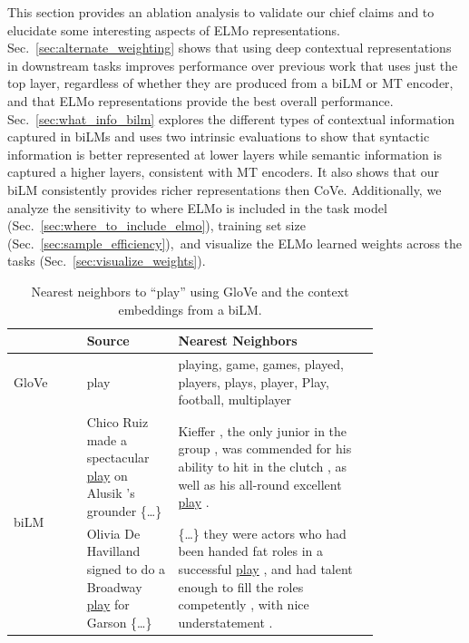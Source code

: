 \documentclass[11pt,a4paper]{article}
\newcommand{\ELMO}{ELMo}
\begin{document}
This section provides an ablation analysis to validate our chief claims and to elucidate some interesting aspects of \ELMO{} representations.
Sec.~\ref{sec:alternate_weighting} shows that using deep contextual representations in downstream tasks improves performance over previous work that uses just the top layer, regardless of whether they are produced from a biLM or MT encoder, and that \ELMO{} representations provide the best overall performance. 
Sec.~\ref{sec:what_info_bilm} explores the different types of contextual information captured in biLMs and uses two intrinsic evaluations to show that syntactic information is better represented at lower layers while semantic information is captured a higher layers, consistent with MT encoders.
It also shows that our biLM consistently provides richer representations then CoVe.
Additionally, we analyze the sensitivity to where \ELMO{} is included in the task model (Sec.~\ref{sec:where_to_include_elmo}), training set size (Sec.~\ref{sec:sample_efficiency}),~and visualize the \ELMO{} learned weights across the tasks (Sec.~\ref{sec:visualize_weights}). 


\begin{table}   %
\centering
\begin{tabular}{lm{0.25\linewidth}|m{0.55\linewidth}} \\
 & Source & Nearest Neighbors \\ \hline \hline
GloVe & play & playing, game, games, played, players, plays, player, Play, football, multiplayer \\ \hline
\multirow{2}{*}[-3ex]{biLM} & Chico Ruiz made a spectacular \underline{play} on Alusik 's grounder \{\ldots\}
& Kieffer , the only junior in the group , was commended for his ability to hit in the clutch , as well as his all-round excellent \underline{play} . \\ \cline{2-3}
& Olivia De Havilland signed to do a Broadway \underline{play} for Garson \{\ldots\}
& \{\ldots\} they were actors who had been handed fat roles in a successful \underline{play} , and had talent enough to fill the roles competently , with nice understatement . \\ 
\end{tabular}
\caption{Nearest neighbors to ``play'' using GloVe and the context embeddings from a biLM.}
\label{table:nearest_neighbors}
\end{table}  %
\end{document}

